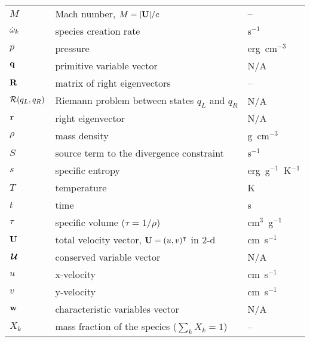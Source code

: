 \begin{center}
\begin{longtable}{|l|p{3.25in}|l|}
%
$M$       & Mach number, $M = |{\bf U}|/c$               & -- \\
%
${\dot{\omega}}_k$ & species creation rate                         & s$^{-1}$ \\
% 
$p$     & pressure                                   & erg~cm$^{-3}$ \\
%
${\bf q}$     & primitive variable vector                 & N/A \\
%
${\bf R}$ & matrix of right eigenvectors              & -- \\
%
${\mathcal{R}}(q_L, q_R)$ & Riemann problem between states $q_L$ and $q_R$ & N/A \\
%
${\bf r}$     & right eigenvector                          & N/A \\
%
$\rho$  & mass density  & g~cm$^{-3}$ \\
%
$S$     & source term to the divergence constraint   & s$^{-1}$ \\
%
$s$     & specific entropy                           & erg~g$^{-1}$~K$^{-1}$ \\
%
$T$     & temperature                                & K \\
%
$t$     & time                                       & s \\
%
$\tau$  & specific volume ($\tau = 1/\rho$)          & cm$^3$~g$^{-1}$ \\
%
${\bf U}$   & total velocity vector, ${\bf U} = (u, v)^\intercal$ in 2-d & cm~s$^{-1}$ \\
%
${\,\boldsymbol{\mathcal{U}}}$   & conserved variable vector & N/A \\
%
$u$     & x-velocity   & cm~s$^{-1}$ \\
%
$v$     & y-velocity   & cm~s$^{-1}$ \\
%
${\bf w}$     & characteristic variables vector                   & N/A \\
%
$X_k$   & mass fraction of the species ($\sum_k X_k = 1$) & -- \\
\end{longtable}
\end{center}
\renewcommand{\arraystretch}{1.0}


